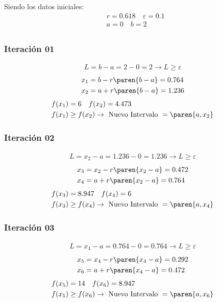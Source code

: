 \begin{homeworkProblem}
Siendo los datos iniciales:
\begin{align*}
    &r=0.618\quad \varepsilon = 0.1 \\
    &a=0\quad  b=2\\
\end{align*}


\subsubsection{Iteración 01}
\begin{align*}
    L=b-a=2-0=2 \rightarrow L \geq \varepsilon
\end{align*}
\begin{align*}
    &x_1=b - r\paren{b-a}= 0.764 \\
    &x_2=a + r\paren{b-a}= 1.236 
\end{align*}
\begin{align*}
    &f(x_1)=6 \quad f(x_2)=4.473 \\
    &f(x_1) \geq f(x_2) \rightarrow \text{ Nuevo Intervalo } = \paren{a,x_2}
\end{align*}


\subsubsection{Iteración 02}
\begin{align*}
    L=x_2-a=1.236-0=1.236 \rightarrow L \geq \varepsilon
\end{align*}
\begin{align*}
    &x_3=x_2 - r\paren{x_2-a}= 0.472 \\
    &x_4=a + r\paren{x_2-a}= 0.764
\end{align*}
\begin{align*}
    &f(x_3)=8.947 \quad f(x_4)=6 \\
    &f(x_3) \geq f(x_4) \rightarrow \text{ Nuevo Intervalo } = \paren{a,x_4}
\end{align*}


\subsubsection{Iteración 03}
\begin{align*}
    L=x_4-a=0.764-0=0.764 \rightarrow L \geq \varepsilon
\end{align*}
\begin{align*}
    &x_5=x_4 - r\paren{x_4-a}= 0.292 \\
    &x_6=a + r\paren{x_4-a}= 0.472
\end{align*}
\begin{align*}
    &f(x_5)=14 \quad f(x_6)=8.947 \\
    &f(x_5) \geq f(x_6) \rightarrow \text{ Nuevo Intervalo } = \paren{a,x_6}
\end{align*}


\end{homeworkProblem}
